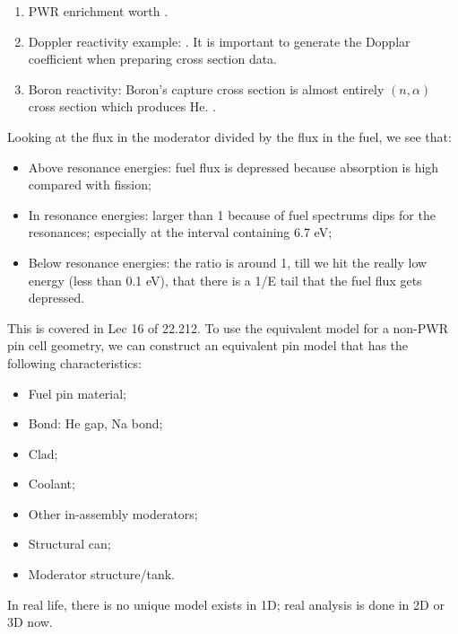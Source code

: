 \documentclass{school-22.211-notes}
\begin{document}
\begin{enumerate}
\item PWR enrichment worth . 

\item Doppler reactivity example: . It is important to generate the Dopplar coefficient when preparing cross section data. 

\item Boron reactivity: Boron's capture cross section is almost entirely $(n,\alpha)$ cross section which produces He. .
\end{enumerate}
Looking at the flux in the moderator divided by the flux in the fuel, we see that:
\begin{itemize}
\item Above resonance energies: fuel flux is depressed because absorption is high compared with fission; 
\item In resonance energies: larger than 1 because of fuel spectrums dips for the resonances; especially at the interval containing 6.7 eV;
\item Below resonance energies: the ratio is around 1, till we hit the really low energy (less than 0.1 eV), that there is a 1/E tail that the fuel flux gets depressed. 
\end{itemize}




\clearpage
{}
This is covered in Lec 16 of 22.212. To use the equivalent model for a non-PWR pin cell geometry, we can construct an equivalent pin model that has the following characteristics: 
\begin{itemize}
\item Fuel pin material;
\item Bond: He gap, Na bond;
\item Clad;
\item Coolant;
\item Other in-assembly moderators;
\item Structural can;
\item Moderator structure/tank.
\end{itemize}
In real life, there is no unique model exists in 1D; real analysis is done in 2D or 3D now. 




\clearpage
\end{document}
